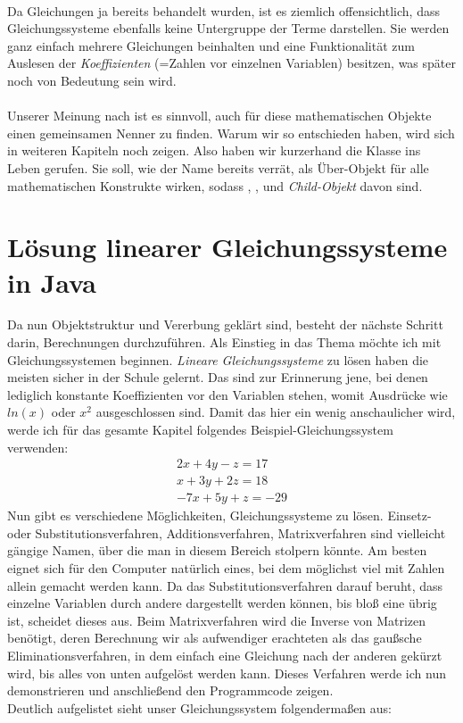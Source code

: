 \\
Da Gleichungen ja bereits behandelt wurden, ist es ziemlich offensichtlich, dass Gleichungssysteme ebenfalls keine Untergruppe der Terme darstellen. Sie werden ganz einfach mehrere Gleichungen beinhalten und eine Funktionalität zum Auslesen der \textit{Koeffizienten} (=Zahlen vor einzelnen Variablen) besitzen, was später noch von Bedeutung sein wird.\\
\\
Unserer Meinung nach ist es sinnvoll, auch für diese mathematischen Objekte einen gemeinsamen Nenner zu finden. Warum wir so entschieden haben, wird sich in weiteren Kapiteln noch zeigen. Also haben wir kurzerhand die Klasse  ins Leben gerufen. Sie soll, wie der Name bereits verrät, als Über-Objekt für alle mathematischen Konstrukte wirken, sodass , ,  und  \textit{Child-Objekt} davon sind.

\section{Lösung linearer Gleichungssysteme in Java}
Da nun Objektstruktur und Vererbung geklärt sind, besteht der nächste Schritt darin, Berechnungen durchzuführen. Als Einstieg in das Thema möchte ich mit Gleichungssystemen beginnen. \textit{Lineare Gleichungssysteme} zu lösen haben die meisten sicher in der Schule gelernt. Das sind zur Erinnerung jene, bei denen lediglich konstante Koeffizienten vor den Variablen stehen, womit Ausdrücke wie $ln(x)$ oder $x^2$ ausgeschlossen sind. Damit das hier ein wenig anschaulicher wird, werde ich für das gesamte Kapitel folgendes Beispiel-Gleichungssystem verwenden:\\
\begin{gather*}
2x + 4y - z = 17\\
x + 3y + 2z = 18\\
-7x + 5y + z = -29
\end{gather*}
\noindent
Nun gibt es verschiedene Möglichkeiten, Gleichungssysteme zu lösen. Einsetz- oder Substitutionsverfahren, Additionsverfahren, Matrixverfahren sind vielleicht gängige Namen, über die man in diesem Bereich stolpern könnte. Am besten eignet sich für den Computer natürlich eines, bei dem möglichst viel mit Zahlen allein gemacht werden kann. Da das Substitutionsverfahren darauf beruht, dass einzelne Variablen durch andere dargestellt werden können, bis bloß eine übrig ist, scheidet dieses aus. Beim Matrixverfahren wird die Inverse von Matrizen benötigt, deren Berechnung wir als aufwendiger erachteten als das gaußsche Eliminationsverfahren, in dem einfach eine Gleichung nach der anderen gekürzt wird, bis alles von unten aufgelöst werden kann. Dieses Verfahren werde ich nun demonstrieren und anschließend den Programmcode zeigen.\\
Deutlich aufgelistet sieht unser Gleichungssystem folgendermaßen aus:

